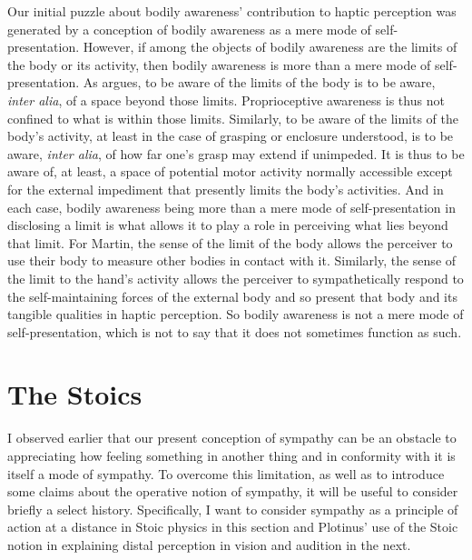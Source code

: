 Our initial puzzle about bodily awareness' contribution to haptic perception was generated by a conception of bodily awareness as a mere mode of self-pre\-sen\-ta\-tion. However, if among the objects of bodily awareness are the limits of the body or its activity, then bodily awareness is more than a mere mode of self-presentation. As \citet{Martin:1992aa} argues, to be aware of the limits of the body is to be aware, \emph{inter alia}, of a space beyond those limits. Proprioceptive awareness is thus not confined to what is within those limits. Similarly, to be aware of the limits of the body's activity, at least in the case of grasping or enclosure understood, is to be aware, \emph{inter alia}, of how far one's grasp may extend if unimpeded. It is thus to be aware of, at least, a space of potential motor activity normally accessible except for the external impediment that presently limits the body's activities. And in each case, bodily awareness being more than a mere mode of self-presentation in disclosing a limit is what allows it to play a role in perceiving what lies beyond that limit. For Martin, the sense of the limit of the body allows the perceiver to use their body to measure other bodies in contact with it. Similarly, the sense of the limit to the hand's activity allows the perceiver to sympathetically respond to the self-maintaining forces of the external body and so present that body and its tangible qualities in haptic perception. So bodily awareness is not a mere mode of self-presentation, which is not to say that it does not sometimes function as such.



\section{The Stoics} %
\label{sec:the_stoics}

I observed earlier that our present conception of sympathy can be an obstacle to appreciating how feeling something in another thing and in conformity with it is itself a mode of sympathy. To overcome this limitation, as well as to introduce some claims about the operative notion of sympathy, it will be useful to consider briefly a select history. Specifically, I want to consider sympathy as a principle of action at a distance in Stoic physics in this section and Plotinus' use of the Stoic notion in explaining distal perception in vision and audition in the next. 

